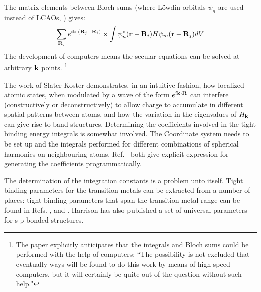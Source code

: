 The matrix elements between Bloch sums (where L\"owdin orbitals $\psi_{n}$ 
are used instead of LCAOs, \cite{lowdin62}) gives:
%
\begin{equation}
\sum_{{\bf R}_{j}} e^{i{\bf k}\cdot({\bf R}_{j}-{\bf R}_{i})}\times\int \psi^{*}_{n}({\bf r}-{\bf R}_{i})H\psi_{m}({\bf r}-{\bf R}_{j})dV
\end{equation}
%
The development of computers means the secular equations can be solved 
at arbitrary ${\bf k}$ points. \footnote{The paper explicitly anticipates that the integrals and Bloch 
sums could be performed with the help of computers: ``The possibility is not excluded 
that eventually ways will be found to do this work by means of high-speed computers, but
it will certainly be quite out of the question without such help."} 

The work of Slater-Koster demonstrates, in an intuitive fashion, how localized atomic
states, when modulated by a wave of the form $e^{i{\bf k}\cdot{\bf R}}$ can interfere 
(constructively or deconstructively) to allow charge to accumulate in different 
spatial patterns between atoms, and how the variation in the eigenvalues of $H_{{\bf k}}$
can give rise to band structures. Determining the coefficients involved in the 
tight binding energy integrals is somewhat involved. The Coordinate system needs
to be set up and the integrals performed for different combinations of spherical
harmonics on neighbouring atoms. Ref.~\cite{sharma79,podolsky04} both give explicit
expression for generating the coefficients programmatically.

The determination of the integration constants is a problem unto itself.
Tight binding parameters for the transition metals can be extracted from 
a number of places: tight binding parameters that span the transition
metal range can be found in Refs. \cite{nieminen76}, \cite{pettifor77} and \cite{jepsen75, andersen77, harrison80}.
Harrison has also published a set of universal parameters for s-p bonded structures.

